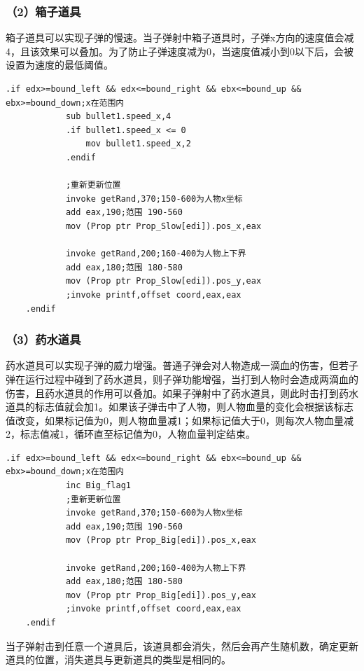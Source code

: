 \subsubsection{（2）箱子道具}
箱子道具可以实现子弹的慢速。当子弹射中箱子道具时，子弹x方向的速度值会减4，且该效果可以叠加。为了防止子弹速度减为0，当速度值减小到0以下后，会被设置为速度的最低阈值。
\begin{lstlisting}[language={[x86masm]Assembler}]
    .if edx>=bound_left && edx<=bound_right	&& ebx<=bound_up &&  ebx>=bound_down;x在范围内								
            sub bullet1.speed_x,4
            .if bullet1.speed_x <= 0
                mov bullet1.speed_x,2
            .endif

            ;重新更新位置
            invoke getRand,370;150-600为人物x坐标
            add eax,190;范围 190-560
            mov (Prop ptr Prop_Slow[edi]).pos_x,eax

            invoke getRand,200;160-400为人物上下界
            add eax,180;范围 180-580
            mov (Prop ptr Prop_Slow[edi]).pos_y,eax
            ;invoke printf,offset coord,eax,eax			
    .endif
\end{lstlisting}
\subsubsection{（3）药水道具}
药水道具可以实现子弹的威力增强。普通子弹会对人物造成一滴血的伤害，但若子弹在运行过程中碰到了药水道具，则子弹功能增强，当打到人物时会造成两滴血的伤害，且药水道具的作用可以叠加。如果子弹射中了药水道具，则此时击打到药水道具的标志值就会加1。如果该子弹击中了人物，则人物血量的变化会根据该标志值改变，如果标记值为0，则人物血量减1；如果标记值大于0，则每次人物血量减2，标志值减1，循环直至标记值为0，人物血量判定结束。
\begin{lstlisting}[language={[x86masm]Assembler}]
    .if edx>=bound_left && edx<=bound_right	&& ebx<=bound_up &&  ebx>=bound_down;x在范围内								
            inc	Big_flag1
            ;重新更新位置
            invoke getRand,370;150-600为人物x坐标
            add eax,190;范围 190-560
            mov (Prop ptr Prop_Big[edi]).pos_x,eax

            invoke getRand,200;160-400为人物上下界
            add eax,180;范围 180-580
            mov (Prop ptr Prop_Big[edi]).pos_y,eax
            ;invoke printf,offset coord,eax,eax			
    .endif
\end{lstlisting}
\par
当子弹射击到任意一个道具后，该道具都会消失，然后会再产生随机数，确定更新道具的位置，消失道具与更新道具的类型是相同的。

